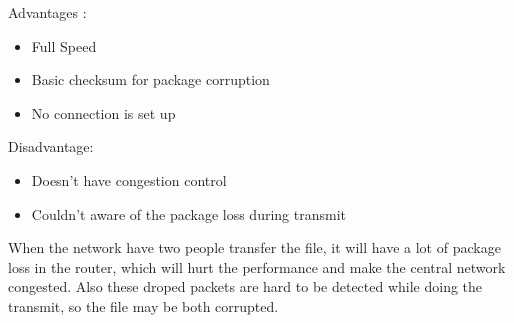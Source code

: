 \documentclass{article}
\begin{document}
Advantages :
\begin{itemize}
    \item Full Speed
    \item Basic checksum for package corruption
    \item No connection is set up
\end{itemize}
Disadvantage:
\begin{itemize}
    \item Doesn't have congestion control
    \item Couldn't aware of the package loss during transmit
\end{itemize}

When the network have two people transfer the file, it will have a lot of package loss in the router, which will hurt the performance and make the central network congested. Also these droped packets are hard to be detected while doing the transmit, so the file may be both corrupted. 
\end{document}
